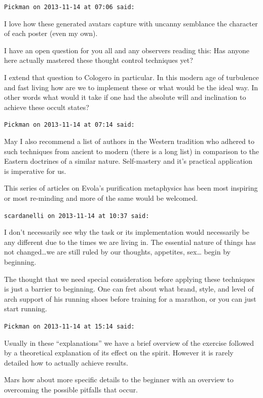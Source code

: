 \begin{footnotesize}
\begin{sffamily}
\hfill

\texttt{Pickman on 2013-11-14 at 07:06 said: }

I love how these generated avatars capture with uncanny semblance the character of each poster (even my own). 

I have an open question for you all and any observers reading this: Has anyone here actually mastered these thought control techniques yet? 

I extend that question to Cologero in particular. In this modern age of turbulence and fast living how are we to implement these or what would be the ideal way. In other words what would it take if one had the absolute will and inclination to achieve these occult states?


\hfill

\texttt{Pickman on 2013-11-14 at 07:14 said: }

May I also recommend a list of authors in the Western tradition who adhered to such techniques from ancient to modern (there is a long list) in comparison to the Eastern doctrines of a similar nature. Self-mastery and it's practical application is imperative for us.

This series of articles on Evola's purification metaphysics has been most inspiring or most re-minding and more of the same would be welcomed.


\hfill

\texttt{scardanelli on 2013-11-14 at 10:37 said: }

I don't necessarily see why the task or its implementation would necessarily be any different due to the times we are living in. The essential nature of things has not changed…we are still ruled by our thoughts, appetites, sex… begin by beginning. 

The thought that we need special consideration before applying these techniques is just a barrier to beginning. One can fret about what brand, style, and level of arch support of his running shoes before training for a marathon, or you can just start running.


\hfill

\texttt{Pickman on 2013-11-14 at 15:14 said: }

Usually in these “explanations” we have a brief overview of the exercise followed by a theoretical explanation of its effect on the spirit. However it is rarely detailed how to actually achieve results. 

Mars how about more specific details to the beginner with an overview to overcoming the possible pitfalls that occur.


\end{sffamily}
\end{footnotesize}
